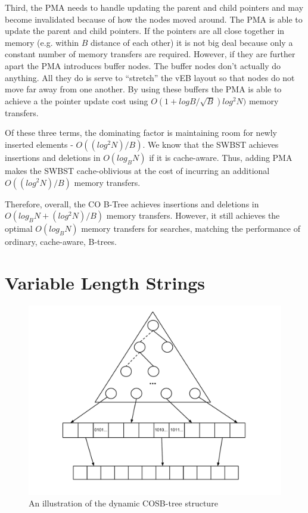 \documentclass{style}
\begin{document}
Third, the PMA needs to handle updating the parent and child pointers and may
become invalidated because of how the nodes moved around. The PMA is able to
update the parent and child pointers. If the pointers are all close together
in memory (e.g. within $B$ distance of each other) it is not big deal because
only a constant number of memory transfers are required. However, if they are
further apart the PMA introduces buffer nodes. The buffer nodes don't actually
do anything. All they do is serve to ``stretch'' the vEB layout so that nodes
do not move far away from one another. By using these buffers the PMA is able
to achieve a the pointer update cost using $O(1+ logB / \sqrt{B}) log^2 N)$
memory transfers.

Of these three terms, the dominating factor is maintaining room for newly
inserted elements - $O((log^2N)/B)$. We know that the SWBST achieves
insertions and deletions in $O(log_B N)$ if it is cache-aware. Thus, adding
PMA makes the SWBST cache-oblivious at the cost of incurring an additional
$O((log^2N)/B)$ memory transfers.

Therefore, overall, the CO B-Tree achieves insertions and deletions in
$O(log_B N + (log^2N)/B)$ memory transfers. However, it still achieves the
optimal $O(log_B N)$ memory transfers for searches, matching the performance
of ordinary, cache-aware, B-trees.

\section{Variable Length Strings}
\begin{figure}

\begin{center}
	\includegraphics[width=0.8\columnwidth]{figures/COSB-treegeneralstructurediagram.pdf}
\end{center}

\caption{An illustration of the dynamic COSB-tree structure}
\label{fig:string_structure}
\end{figure}
\end{document}

